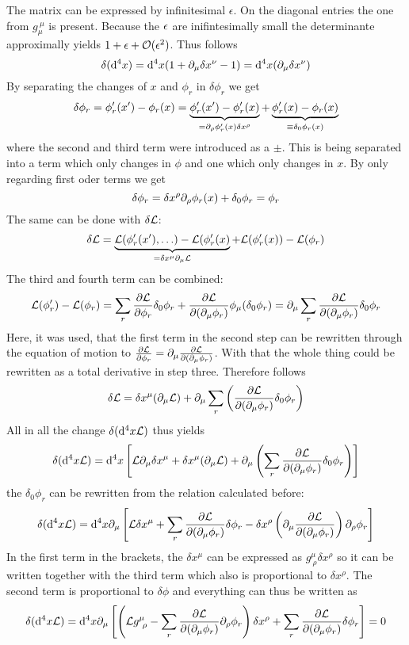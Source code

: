 The matrix can be expressed by infinitesimal $\epsilon$. On the diagonal entries the one from $g_\mu^{~\mu}$ is present. Because the $\epsilon$ are inifintesimally small the determinante approximally yields $1 + \epsilon + \mathcal{O}(\epsilon^2)$. Thus follows
\[ \delta({\rm d}^4 x) = {\rm d}^4x( 1+ \partial_\mu \delta x^\nu -1) = {\rm d}^4x( \partial_\mu \delta x^\nu)\]
By separating the changes of $x$ and $\phi_r$ in $\delta \phi_r$ we get
\[ \delta \phi_r = \phi_r'(x') - \phi_r(x) = \underbrace{\phi_r'(x') - \phi_r'(x)}_{=\partial_\rho \phi'_r(x) \delta x^\rho} + \underbrace{\phi_r'(x) - \phi_r(x)}_{\equiv \delta_0 \phi_r(x)} \]
where the second and third term were introduced as a $\pm$. This is being separated into a term which only changes in $\phi$ and one which only changes in $x$. By only regarding first oder terms we get
\[ \delta \phi_r = \delta x^\rho \partial_\rho \phi_r(x) + \delta_0 \phi_r = \phi_r\]
The same can be done with $\delta \mathcal{L}$:
\[ \delta \mathcal{L} = \underbrace{ \mathcal{L}( \phi'_r(x'), \ldots) - \mathcal{L}(\phi_r'(x)}_{= \delta x^\mu \partial_\mu \mathcal{L}}+ \mathcal{L}(\phi'_r(x)) - \mathcal{L}(\phi_r) \]
The third and fourth term can be combined:
\[ \mathcal{L}(\phi_r') - \mathcal{L}(\phi_r) = \sum_r \frac{ \partial \mathcal{L}}{\partial \phi_r} \delta_0 \phi_r + \frac{\partial \mathcal{L}}{\partial (\partial_\mu \phi_r)} \phi_\mu ( \delta_0 \phi_r) = \partial_\mu \sum_r \frac{\partial \mathcal{L}}{\partial ( \partial_\mu \phi_r)} \delta_0 \phi_r\]
Here, it was used, that the first term in the second step can be rewritten through the equation of motion to $\frac{\partial \mathcal{L}}{\partial \phi_r} = \partial_\mu \frac{\partial \mathcal{L}}{\partial ( \partial_\mu \phi_r)}$. With that the whole thing could be rewritten as a total derivative in step three. Therefore follows
\[ \delta \mathcal{L} = \delta x^\mu ( \partial_\mu \mathcal{L}) + \partial_\mu \sum_r \left( \frac{\partial \mathcal{L}}{\partial( \partial_\mu \phi_r) } \delta_0 \phi_r\right)\]
All in all the change $\delta( {\rm d}^4 x \mathcal{L})$ thus yields
\[ \delta( {\rm d}^4 x\mathcal{L}) = {\rm d}^4 x \left[ \mathcal{L} \partial_\mu \delta x^\mu + \delta x^\mu ( \partial_\mu \mathcal{L}) + \partial_\mu \left( \sum_r \frac{\partial \mathcal{L}}{\partial( \partial_\mu \phi_r)} \delta_0 \phi_r \right)\right]\]
the $\delta_0 \phi_r$ can be rewritten from the relation calculated before:
\[ \delta( {\rm d}^4 x \mathcal{L}) = {\rm d}^4 x \partial_\mu\left[ \mathcal{L} \delta x^\mu + \sum_r \frac{\partial \mathcal{L}}{\partial (\partial_\mu \phi_r)} \delta\phi_r - \delta x^\rho \left( \partial_\mu \frac{\partial \mathcal{L}}{\partial ( \partial_\mu \phi_r)} \right) \partial_\rho \phi_r\right]\]
In the first term in the brackets, the $\delta x^\mu$ can be expressed as $g^\mu_{~\rho} \delta x^\rho$ so it can be written together with the third term which also is proportional to $\delta x^\rho$. The second term is proportional to $\delta \phi$ and everything can thus be written as
\[ \delta( {\rm d}^4 x \mathcal{L}) = {\rm d}^4x \partial_\mu \left[ \left( \mathcal{L} g^\mu _{~\rho} - \sum_r \frac{\partial \mathcal{L}}{\partial ( \partial_\mu \phi_r)} \partial_\rho \phi_r \right) \delta x^\rho + \sum_r \frac{\partial \mathcal{L}}{\partial ( \partial_\mu \phi_r)} \delta \phi_r \right]  = 0\]
